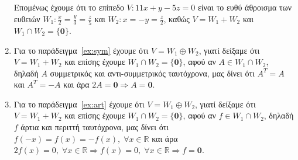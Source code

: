 \begin{examples}
\begin{enumerate}
Επομένως έχουμε ότι το επίπεδο $ V: 11x+y-5z=0 $ είναι το 
ευθύ άθροισμα των ευθειών $ W_{1}: \frac{x}{2} = \frac{y}{3} = 
\frac{z}{5}$ και $ W_{2}: x=-y= \frac{z}{2} $, καθώς 
$ V = W_{1}+W_{2} $ και $ W_{1}\cap W_{2} = \{ \mathbf{0} \} $.

            \item Για το παράδειγμα~\ref{ex:sym} έχουμε ότι $ V = W_{1} \oplus W_{2} $, 
                γιατί δείξαμε ότι $ V= W_{1}+W_{2} $ και επίσης έχουμε 
                $ W_{1} \cap W_{2} = \{ \mathbf{0} \} $, 
                αφού αν $A \in W_{1} \cap W_{2}$, δηλαδή $ A $ συμμετρικός και 
                αντι-συμμετρικός ταυτόχρονα, μας δίνει ότι $ A^{T} = A $ και 
                $ A^{T}=-A $ και άρα $ 2A = \mathbf{0} \Rightarrow A= \mathbf{0} $.

            \item Για το παράδειγμα~\ref{ex:art} έχουμε ότι $ V = W_{1} \oplus W_{2} $, 
                γιατί δείξαμε ότι $ V= W_{1}+W_{2} $ και επίσης έχουμε 
                $ W_{1} \cap W_{2} = \{ \mathbf{0} \} $, 
                αφού αν $f \in W_{1} \cap W_{2}$, δηλαδή $ f $ άρτια και περιττή 
                ταυτόχρονα, μας δίνει ότι $ f(-x)=f(x)=-f(x), \; \forall x \in 
                \mathbb{R} $ και άρα $ 2f(x) = 0, \; \forall x \in 
                \mathbb{R} \Rightarrow f(x)=0, \; \forall x \in \mathbb{R} 
                \Rightarrow f = \mathbf{0} $.
        \end{enumerate}
    \end{examples}

    
